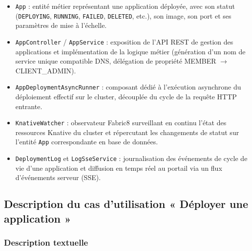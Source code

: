 \begin{itemize}
    \item \texttt{App} : entité métier représentant une application déployée, avec son statut (\texttt{DEPLOYING}, \texttt{RUNNING}, \texttt{FAILED}, \texttt{DELETED}, etc.), son image, son port et ses paramètres de mise à l'échelle.
    \item \texttt{AppController} / \texttt{AppService} : exposition de l'API REST de gestion des applications et implémentation de la logique métier (génération d'un nom de service unique compatible DNS, délégation de propriété MEMBER $\rightarrow$ CLIENT\_ADMIN).
    \item \texttt{AppDeploymentAsyncRunner} : composant dédié à l'exécution asynchrone du déploiement effectif sur le cluster, découplée du cycle de la requête HTTP entrante.
    \item \texttt{KnativeWatcher} : observateur Fabric8 surveillant en continu l'état des ressources Knative du cluster et répercutant les changements de statut sur l'entité \texttt{App} correspondante en base de données.
    \item \texttt{DeploymentLog} et \texttt{LogSseService} : journalisation des événements de cycle de vie d'une application et diffusion en temps réel au portail via un flux d'événements serveur (SSE).
\end{itemize}

\subsection{Description du cas d'utilisation « Déployer une application »}

\subsubsection{Description textuelle}

